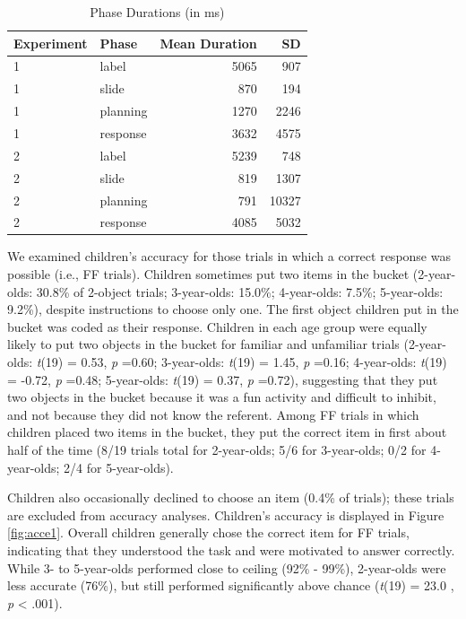\documentclass[english,man]{apa6}
\theoremstyle{definition}
\theoremstyle{definition}
\theoremstyle{definition}
\theoremstyle{remark}
\begin{document}
\begin{table}[b]
\centering
\begin{tabular}{llrr}
  \hline
Experiment & Phase & Mean Duration & SD \\ 
  \hline
1 & label & 5065 & 907 \\ 
  1 & slide & 870 & 194 \\ 
  1 & planning & 1270 & 2246 \\ 
  1 & response & 3632 & 4575 \\ 
   \hline
2 & label & 5239 & 748 \\ 
  2 & slide & 819 & 1307 \\ 
  2 & planning & 791 & 10327 \\ 
  2 & response & 4085 & 5032 \\ 
   \hline
\end{tabular}
\caption{Phase Durations (in ms)} 
\label{tab:phases}
\end{table}

We examined children's accuracy for those trials in which a correct
response was possible (i.e., FF trials). Children sometimes put two
items in the bucket (2-year-olds: 30.8\% of 2-object trials;
3-year-olds: 15.0\%; 4-year-olds: 7.5\%; 5-year-olds: 9.2\%), despite
instructions to choose only one. The first object children put in the
bucket was coded as their response. Children in each age group were
equally likely to put two objects in the bucket for familiar and
unfamiliar trials (2-year-olds: \emph{t}(19) = 0.53, \emph{p} =0.60;
3-year-olds: \emph{t}(19) = 1.45, \emph{p} =0.16; 4-year-olds:
\emph{t}(19) = -0.72, \emph{p} =0.48; 5-year-olds: \emph{t}(19) = 0.37,
\emph{p} =0.72), suggesting that they put two objects in the bucket
because it was a fun activity and difficult to inhibit, and not because
they did not know the referent. Among FF trials in which children placed
two items in the bucket, they put the correct item in first about half
of the time (8/19 trials total for 2-year-olds; 5/6 for 3-year-olds; 0/2
for 4-year-olds; 2/4 for 5-year-olds).

Children also occasionally declined to choose an item (0.4\% of trials);
these trials are excluded from accuracy analyses. Children's accuracy is
displayed in Figure \ref{fig:acce1}. Overall children generally chose
the correct item for FF trials, indicating that they understood the task
and were motivated to answer correctly. While 3- to 5-year-olds
performed close to ceiling (92\% - 99\%), 2-year-olds were less accurate
(76\%), but still performed significantly above chance (\emph{t}(19) =
23.0 , \emph{p} \textless{} .001).
\end{document}
